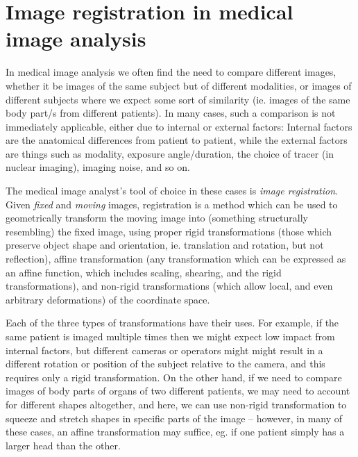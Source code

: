 \section{Image registration in medical image analysis}

In medical image analysis we often find the need to compare different images,
whether it be images of the same subject but of different modalities, or images
of different subjects where we expect some sort of similarity (ie. images of the
same body part/s from different patients). In many cases, such a comparison is
not immediately applicable, either due to internal or external factors: Internal
factors are the anatomical differences from patient to patient, while the
external factors are things such as modality, exposure angle/duration, the
choice of tracer (in nuclear imaging), imaging noise, and so on.

The medical image analyst's tool of choice in these cases is \emph{image
registration}. Given \emph{fixed} and \emph{moving} images, registration is
a method which can be used to geometrically transform the moving image into
(something structurally resembling) the fixed image, using proper rigid
transformations (those which preserve object shape and orientation, ie.
translation and rotation, but not reflection), affine transformation (any
transformation which can be expressed as an affine function, which includes
scaling, shearing, and the rigid transformations), and non-rigid transformations
(which allow local, and even arbitrary deformations) of the coordinate space.

Each of the three types of transformations have their uses. For example, if the
same patient is imaged multiple times then we might expect low impact from
internal factors, but different cameras or operators might might result in a
different rotation or position of the subject relative to the camera, and this
requires only a rigid transformation. On the other hand, if we need to compare
images of body parts of organs of two different patients, we may need to account
for different shapes altogether, and here, we can use non-rigid transformation
to squeeze and stretch shapes in specific parts of the image -- however, in many
of these cases, an affine transformation may suffice, eg. if one patient simply
has a larger head than the other.

\sectend
